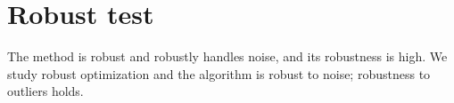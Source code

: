 \section{Robust test}
The method is robust and robustly handles noise, and its robustness is high.
We study robust optimization and the algorithm is robust to noise; robustness to outliers holds.
